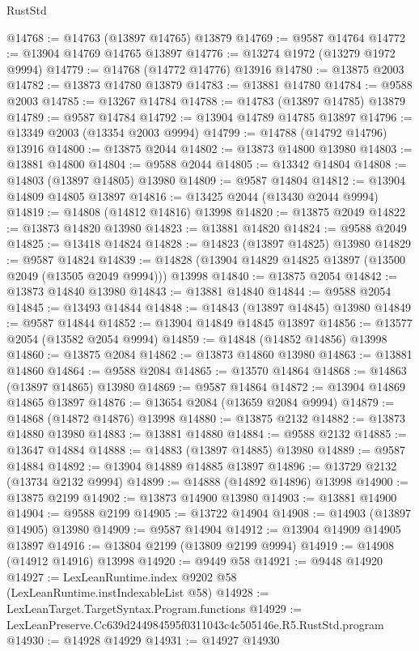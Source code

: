 \begin{lexlean}{RustStd}
\begin{coremodule}
@14768 := @14763 (@13897 @14765) @13879
@14769 := @9587 @14764
@14772 := @13904 @14769 @14765 @13897
@14776 := @13274 @1972 (@13279 @1972 @9994)
@14779 := @14768 (@14772 @14776) @13916
@14780 := @13875 @2003
@14782 := @13873 @14780 @13879
@14783 := @13881 @14780
@14784 := @9588 @2003
@14785 := @13267 @14784
@14788 := @14783 (@13897 @14785) @13879
@14789 := @9587 @14784
@14792 := @13904 @14789 @14785 @13897
@14796 := @13349 @2003 (@13354 @2003 @9994)
@14799 := @14788 (@14792 @14796) @13916
@14800 := @13875 @2044
@14802 := @13873 @14800 @13980
@14803 := @13881 @14800
@14804 := @9588 @2044
@14805 := @13342 @14804
@14808 := @14803 (@13897 @14805) @13980
@14809 := @9587 @14804
@14812 := @13904 @14809 @14805 @13897
@14816 := @13425 @2044 (@13430 @2044 @9994)
@14819 := @14808 (@14812 @14816) @13998
@14820 := @13875 @2049
@14822 := @13873 @14820 @13980
@14823 := @13881 @14820
@14824 := @9588 @2049
@14825 := @13418 @14824
@14828 := @14823 (@13897 @14825) @13980
@14829 := @9587 @14824
@14839 := @14828 (@13904 @14829 @14825 @13897 (@13500 @2049 (@13505 @2049 @9994))) @13998
@14840 := @13875 @2054
@14842 := @13873 @14840 @13980
@14843 := @13881 @14840
@14844 := @9588 @2054
@14845 := @13493 @14844
@14848 := @14843 (@13897 @14845) @13980
@14849 := @9587 @14844
@14852 := @13904 @14849 @14845 @13897
@14856 := @13577 @2054 (@13582 @2054 @9994)
@14859 := @14848 (@14852 @14856) @13998
@14860 := @13875 @2084
@14862 := @13873 @14860 @13980
@14863 := @13881 @14860
@14864 := @9588 @2084
@14865 := @13570 @14864
@14868 := @14863 (@13897 @14865) @13980
@14869 := @9587 @14864
@14872 := @13904 @14869 @14865 @13897
@14876 := @13654 @2084 (@13659 @2084 @9994)
@14879 := @14868 (@14872 @14876) @13998
@14880 := @13875 @2132
@14882 := @13873 @14880 @13980
@14883 := @13881 @14880
@14884 := @9588 @2132
@14885 := @13647 @14884
@14888 := @14883 (@13897 @14885) @13980
@14889 := @9587 @14884
@14892 := @13904 @14889 @14885 @13897
@14896 := @13729 @2132 (@13734 @2132 @9994)
@14899 := @14888 (@14892 @14896) @13998
@14900 := @13875 @2199
@14902 := @13873 @14900 @13980
@14903 := @13881 @14900
@14904 := @9588 @2199
@14905 := @13722 @14904
@14908 := @14903 (@13897 @14905) @13980
@14909 := @9587 @14904
@14912 := @13904 @14909 @14905 @13897
@14916 := @13804 @2199 (@13809 @2199 @9994)
@14919 := @14908 (@14912 @14916) @13998
@14920 := @9449 @58
@14921 := @9448 @14920
@14927 := LexLeanRuntime.index @9202 @58 (LexLeanRuntime.instIndexableList @58)
@14928 := LexLeanTarget.TargetSyntax.Program.functions
@14929 := LexLeanPreserve.Cc639d244984595f0311043c4c505146e.R5.RustStd.program
@14930 := @14928 @14929
@14931 := @14927 @14930

\end{coremodule}
\end{lexlean}
